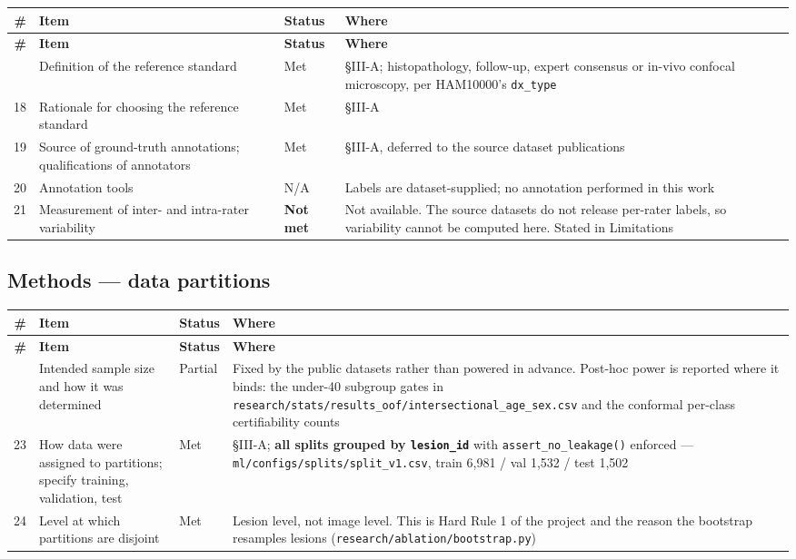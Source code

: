 \begin{longtable}{@{}rp{}lp{}@{}}
\toprule
\textbf{\#} & \textbf{Item} & \textbf{Status} & \textbf{Where} \\
\midrule
\endfirsthead
\toprule
\textbf{\#} & \textbf{Item} & \textbf{Status} & \textbf{Where} \\
\midrule
\endhead
\bottomrule
\endfoot
17 & Definition of the reference standard & Met & \S{}III-A; histopathology, follow-up, expert consensus or in-vivo confocal microscopy, per HAM10000's \texttt{dx\_type} \\
18 & Rationale for choosing the reference standard & Met & \S{}III-A \\
19 & Source of ground-truth annotations; qualifications of annotators & Met & \S{}III-A, deferred to the source dataset publications \\
20 & Annotation tools & N/A & Labels are dataset-supplied; no annotation performed in this work \\
21 & Measurement of inter- and intra-rater variability & \textbf{Not met} & Not available. The source datasets do not release per-rater labels, so variability cannot be computed here. Stated in Limitations \\
\end{longtable}


\subsection*{Methods --- data partitions}


\begin{longtable}{@{}rp{}lp{}@{}}
\toprule
\textbf{\#} & \textbf{Item} & \textbf{Status} & \textbf{Where} \\
\midrule
\endfirsthead
\toprule
\textbf{\#} & \textbf{Item} & \textbf{Status} & \textbf{Where} \\
\midrule
\endhead
\bottomrule
\endfoot
22 & Intended sample size and how it was determined & Partial & Fixed by the public datasets rather than powered in advance. Post-hoc power is reported where it binds: the under-40 subgroup gates in \texttt{research/stats/results\_oof/intersectional\_age\_sex.csv} and the conformal per-class certifiability counts \\
23 & How data were assigned to partitions; specify training, validation, test & Met & \S{}III-A; \textbf{all splits grouped by \texttt{lesion\_id}} with \texttt{assert\_no\_leakage()} enforced --- \texttt{ml/configs/splits/split\_v1.csv}, train 6,981 / val 1,532 / test 1,502 \\
24 & Level at which partitions are disjoint & Met & Lesion level, not image level. This is Hard Rule 1 of the project and the reason the bootstrap resamples lesions (\texttt{research/ablation/bootstrap.py}) \\
\end{longtable}


